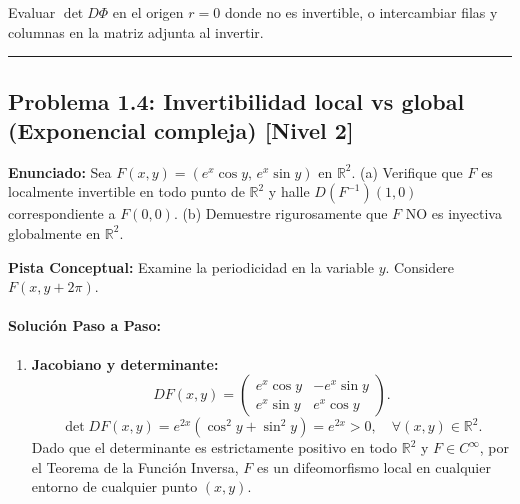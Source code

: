 \documentclass[11pt,a4paper]{article}
\begin{document}
\begin{trapbox}
Evaluar $\det D\Phi$ en el origen $r=0$ donde no es invertible, o intercambiar filas y columnas en la matriz adjunta al invertir.
\end{trapbox}

\vspace{0.5cm}
\hrule
\vspace{0.5cm}

\subsection*{Problema 1.4: Invertibilidad local vs global (Exponencial compleja) \hfill \color{primaryblue}\small[Nivel 2]}

\begin{tcolorbox}[colback=white,colframe=gray!40,arc=1mm,boxrule=0.5pt,left=3mm,right=3mm,top=2mm,bottom=2mm]
\textbf{Enunciado:} Sea $F(x,y) = (e^x\cos y, \, e^x\sin y)$ en $\mathbb{R}^2$. (a) Verifique que $F$ es localmente invertible en todo punto de $\mathbb{R}^2$ y halle $D(F^{-1})(1,0)$ correspondiente a $F(0,0)$. (b) Demuestre rigurosamente que $F$ NO es inyectiva globalmente en $\mathbb{R}^2$.
\end{tcolorbox}

\begin{tcolorbox}[colback=yellow!4,colframe=accentamber!70,arc=1mm,boxrule=0.5pt,left=3mm,right=3mm,top=1.5mm,bottom=1.5mm]
\textbf{Pista Conceptual:} Examine la periodicidad en la variable $y$. Considere $F(x, y + 2\pi)$.
\end{tcolorbox}

\paragraph{Solución Paso a Paso:}\par
\begin{enumerate}[label=\textbf{\arabic*.}]
\item \textbf{Jacobiano y determinante:}
\begin{equation*}
DF(x,y) = \begin{pmatrix} e^x\cos y & -e^x\sin y \\ e^x\sin y & e^x\cos y \end{pmatrix}.
\end{equation*}
\begin{equation*}
\det DF(x,y) = e^{2x}(\cos^2 y + \sin^2 y) = e^{2x} > 0, \quad \forall (x,y) \in \mathbb{R}^2.
\end{equation*}
Dado que el determinante es estrictamente positivo en todo $\mathbb{R}^2$ y $F \in C^\infty$, por el Teorema de la Función Inversa, $F$ es un difeomorfismo local en cualquier entorno de cualquier punto $(x,y)$.
\end{enumerate}
\end{document}

